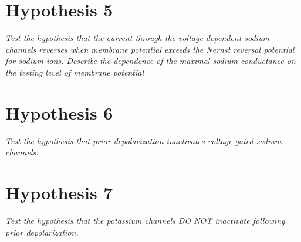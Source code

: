 \documentclass[12pt]{article}
\begin{document}
\section{Hypothesis 5}

\emph{Test the hypothesis that the current through the voltage-dependent sodium channels reverses when membrane potential exceeds the Nernst reversal potential for sodium ions.  Describe the dependence of the maximal sodium conductance on the testing level of membrane potential}

\section{Hypothesis 6}

\emph{Test the hypothesis that prior depolarization inactivates voltage-gated sodium channels.}

\section{Hypothesis 7}

\emph{Test the hypothesis that the potassium channels DO NOT inactivate following prior depolarization.}
\end{document}
